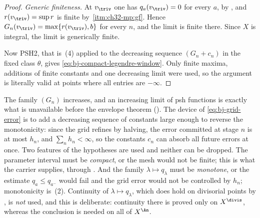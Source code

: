 \begin{proof}
\emph{Generic finiteness.}  At $v_{\triv}$ one has
$q_a(v_{\triv})=0$ for every $a$, by
, and $r(v_{\triv})=\sup r$ is
finite by \,\cref{itm:ch32-mp:gf}.  Hence
$G_n(v_{\triv})=\max\{r(v_{\triv}),b\}$ for every $n$, and the limit is
finite there.  Since $X$ is integral, the limit is generically finite.

Now PSH2, that is \,(4) applied to the
decreasing sequence $(G_n+c_n)$ in the fixed class $\theta$, gives
\eqref{eq:bj-compact-legendre-window}.  Only finite maxima, additions of
finite constants and one decreasing limit were used, so the argument is
literally valid at points where all entries are $-\infty$.
\end{proof}

\begin{remark}
\label{rem:ch39-why-correction}
The family $(G_n)$ increases, and an increasing limit of psh functions is
exactly what is unavailable before the envelope theorem
().  The device of
\eqref{eq:bj-grid-error} is to add a decreasing sequence of constants large
enough to reverse the monotonicity: since the grid refines by halving, the
error committed at stage $n$ is at most $h_n$, and
$\sum_nh_n<\infty$, so the constants $c_n$ can absorb all future errors
at once.  Two features of the hypotheses are used and neither can be
dropped.  The parameter interval must be \emph{compact}, or the mesh would
not be finite; this is what the carrier supplies, through
.  And the family $\lambda\mapsto q_\lambda$
must be \emph{monotone}, or the estimate $q_a\le q_{a^-}$ would fail and
the grid error would not be controlled by $h_n$; monotonicity is
\,(2).  Continuity of
$\lambda\mapsto q_\lambda$, which does hold on divisorial points by
, is \emph{not} used, and this is
deliberate: continuity there is proved only on $X^{\divis}$, whereas the
conclusion is needed on all of $X^{\An}$.
\end{remark}

